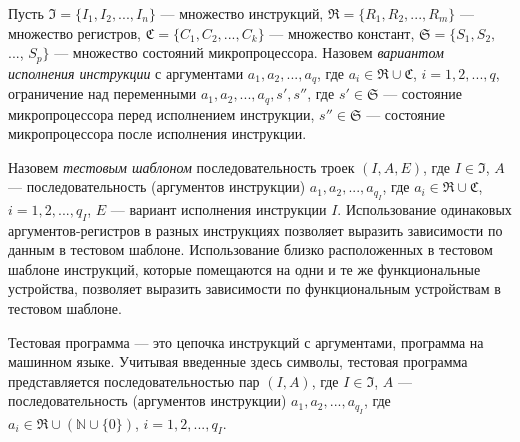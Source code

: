 Пусть $\mathfrak{I} = \{I_1, I_2, ..., I_n\}$ --- множество инструкций, $\mathfrak{R} = \{R_1, R_2, ..., R_m\}$ --- множество регистров, $\mathfrak{C} = \{C_1, C_2, ..., C_k\}$ --- множество констант, $\mathfrak{S} = \{S_1, S_2,$ ..., $S_p\}$ --- множество состояний микропроцессора. Назовем \emph{вариантом исполнения инструкции} с аргументами $a_1, a_2, ..., a_q$, где $a_i \in \mathfrak{R} \cup \mathfrak{C}$, $i = 1, 2, ..., q$, ограничение над переменными $a_1, a_2, ..., a_q, s', s''$, где $s' \in \mathfrak{S}$ --- состояние микропроцессора перед исполнением инструкции, $s'' \in \mathfrak{S}$ --- состояние микропроцессора после исполнения инструкции.

Назовем \emph{тестовым шаблоном} последовательность троек $(I, A, E)$, где $I \in \mathfrak{I}$, $A$ --- последовательность (аргументов инструкции) $a_1, a_2, ..., a_{q_I}$, где $a_i \in \mathfrak{R} \cup \mathfrak{C}$, $i = 1, 2, ..., q_I$, $E$ --- вариант исполнения инструкции $I$. Использование одинаковых аргументов-регистров в разных инструкциях позволяет выразить зависимости по данным в тестовом шаблоне. Использование близко расположенных в тестовом шаблоне инструкций, которые помещаются на одни и те же функциональные устройства, позволяет выразить зависимости по функциональным устройствам в тестовом шаблоне.

Тестовая программа --- это цепочка инструкций с аргументами, программа на машинном языке. Учитывая введенные здесь символы, тестовая программа представляется последовательностью пар $(I, A)$, где $I \in \mathfrak{I}$, $A$ --- последовательность (аргументов инструкции) $a_1, a_2, ..., a_{q_I}$, где $a_i \in \mathfrak{R} \cup (\mathbb{N} \cup \{0\})$, $i = 1, 2, ..., q_I$.

